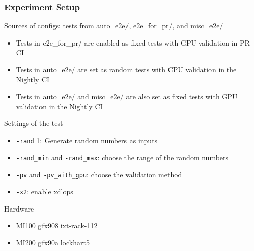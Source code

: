 \documentclass[t, pdftex, aspectratio=169]{beamer}  %
\begin{document}

\begin{frame}
  \frametitle{Experiment Setup}

  Sources of configs: tests from auto\_e2e/, e2e\_for\_pr/, and misc\_e2e/
  \begin{itemize}
  \item Tests in e2e\_for\_pr/ are enabled as fixed tests with GPU validation in PR CI
  \item Tests in auto\_e2e/ are set as random tests with CPU validation in the Nightly CI
  \item Tests in auto\_e2e/ and misc\_e2e/ are also set as fixed tests with GPU validation in the Nightly CI
  \end{itemize}

  Settings of the test
  \begin{itemize}
  \item \texttt{-rand} 1: Generate random numbers as inputs
  \item \texttt{-rand\_min} and \texttt{-rand\_max}: choose the range of the random numbers
  \item \texttt{-pv} and \texttt{-pv\_with\_gpu}: choose the validation method
  \item \texttt{-x2}: enable xdlops
  \end{itemize}

  Hardware
  \begin{itemize}
  \item MI100 gfx908 ixt-rack-112
  \item MI200 gfx90a lockhart5
  \end{itemize}
\end{frame}
\end{document}
